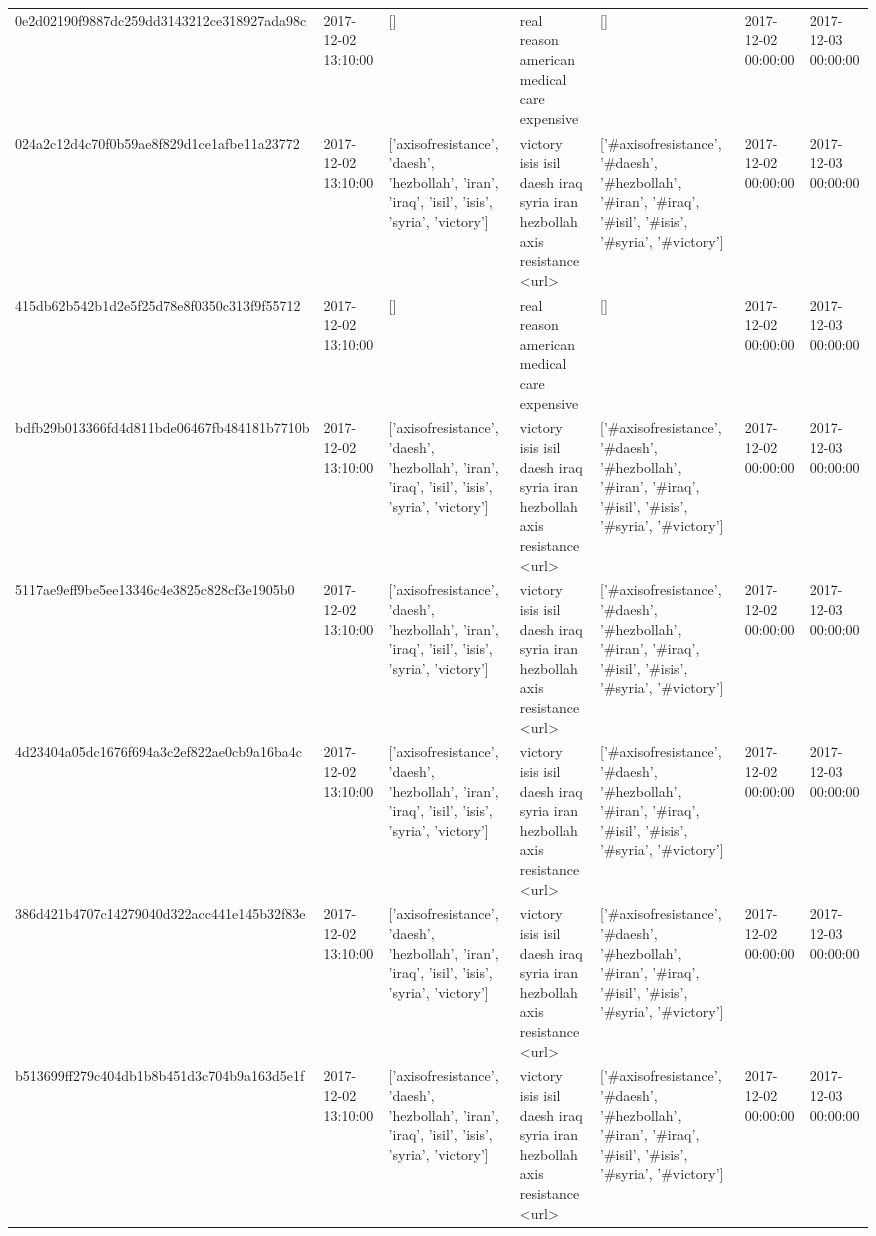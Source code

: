 \begin{tabular}{lllllll}
0e2d02190f9887dc259dd3143212ce318927ada98c & 2017-12-02 13:10:00 & [] & real reason american medical care expensive & [] & 2017-12-02 00:00:00 & 2017-12-03 00:00:00 \\
024a2c12d4c70f0b59ae8f829d1ce1afbe11a23772 & 2017-12-02 13:10:00 & ['axisofresistance', 'daesh', 'hezbollah', 'iran', 'iraq', 'isil', 'isis', 'syria', 'victory'] & victory isis isil daesh iraq syria iran hezbollah axis resistance <url> & ['#axisofresistance', '#daesh', '#hezbollah', '#iran', '#iraq', '#isil', '#isis', '#syria', '#victory'] & 2017-12-02 00:00:00 & 2017-12-03 00:00:00 \\
415db62b542b1d2e5f25d78e8f0350c313f9f55712 & 2017-12-02 13:10:00 & [] & real reason american medical care expensive & [] & 2017-12-02 00:00:00 & 2017-12-03 00:00:00 \\
bdfb29b013366fd4d811bde06467fb484181b7710b & 2017-12-02 13:10:00 & ['axisofresistance', 'daesh', 'hezbollah', 'iran', 'iraq', 'isil', 'isis', 'syria', 'victory'] & victory isis isil daesh iraq syria iran hezbollah axis resistance <url> & ['#axisofresistance', '#daesh', '#hezbollah', '#iran', '#iraq', '#isil', '#isis', '#syria', '#victory'] & 2017-12-02 00:00:00 & 2017-12-03 00:00:00 \\
5117ae9eff9be5ee13346c4e3825c828cf3e1905b0 & 2017-12-02 13:10:00 & ['axisofresistance', 'daesh', 'hezbollah', 'iran', 'iraq', 'isil', 'isis', 'syria', 'victory'] & victory isis isil daesh iraq syria iran hezbollah axis resistance <url> & ['#axisofresistance', '#daesh', '#hezbollah', '#iran', '#iraq', '#isil', '#isis', '#syria', '#victory'] & 2017-12-02 00:00:00 & 2017-12-03 00:00:00 \\
4d23404a05dc1676f694a3c2ef822ae0cb9a16ba4c & 2017-12-02 13:10:00 & ['axisofresistance', 'daesh', 'hezbollah', 'iran', 'iraq', 'isil', 'isis', 'syria', 'victory'] & victory isis isil daesh iraq syria iran hezbollah axis resistance <url> & ['#axisofresistance', '#daesh', '#hezbollah', '#iran', '#iraq', '#isil', '#isis', '#syria', '#victory'] & 2017-12-02 00:00:00 & 2017-12-03 00:00:00 \\
386d421b4707c14279040d322acc441e145b32f83e & 2017-12-02 13:10:00 & ['axisofresistance', 'daesh', 'hezbollah', 'iran', 'iraq', 'isil', 'isis', 'syria', 'victory'] & victory isis isil daesh iraq syria iran hezbollah axis resistance <url> & ['#axisofresistance', '#daesh', '#hezbollah', '#iran', '#iraq', '#isil', '#isis', '#syria', '#victory'] & 2017-12-02 00:00:00 & 2017-12-03 00:00:00 \\
b513699ff279c404db1b8b451d3c704b9a163d5e1f & 2017-12-02 13:10:00 & ['axisofresistance', 'daesh', 'hezbollah', 'iran', 'iraq', 'isil', 'isis', 'syria', 'victory'] & victory isis isil daesh iraq syria iran hezbollah axis resistance <url> & ['#axisofresistance', '#daesh', '#hezbollah', '#iran', '#iraq', '#isil', '#isis', '#syria', '#victory'] & 2017-12-02 00:00:00 & 2017-12-03 00:00:00 \\

\end{tabular}
